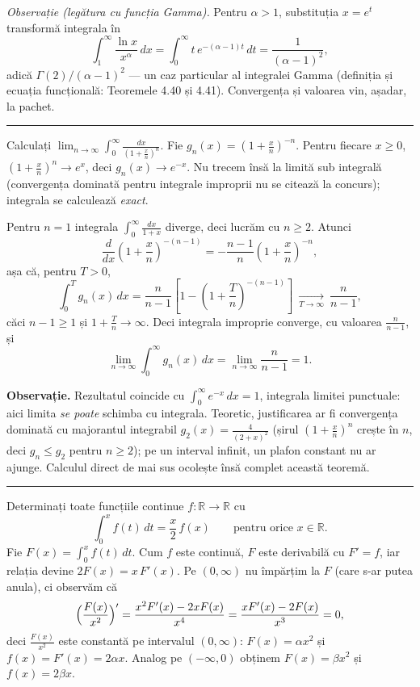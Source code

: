 \emph{Observație (legătura cu funcția Gamma).} Pentru $\alpha>1$, substituția $x=e^{t}$ transformă integrala în
\[ \int_{1}^{\infty}\frac{\ln x}{x^{\alpha}}\,dx=\int_{0}^{\infty}t\,e^{-(\alpha-1)t}\,dt=\frac{1}{(\alpha-1)^{2}} , \]
adică $\Gamma(2)/(\alpha-1)^{2}$ --- un caz particular al integralei Gamma (definiția și ecuația funcțională: Teoremele 4.40 și 4.41). Convergența și valoarea vin, așadar, la pachet.
\vspace{1mm}\hrule

Calculați $\displaystyle\lim_{n\to\infty}\int_0^\infty \frac{dx}{\left(1+\frac{x}{n}\right)^n}$.
\sol Fie $g_n(x)=\left(1+\frac{x}{n}\right)^{-n}$. Pentru fiecare $x\ge 0$, $\left(1+\frac{x}{n}\right)^n\to e^x$, deci $g_n(x)\to e^{-x}$. Nu trecem însă la limită sub integrală (convergența dominată pentru integrale improprii nu se citează la concurs); integrala se calculează \emph{exact}.

Pentru $n=1$ integrala $\int_0^\infty\frac{dx}{1+x}$ diverge, deci lucrăm cu $n\ge2$. Atunci
\[
\frac{d}{dx}\left(1+\frac{x}{n}\right)^{-(n-1)}=-\frac{n-1}{n}\left(1+\frac{x}{n}\right)^{-n},
\]
așa că, pentru $T>0$,
\[
\int_0^T g_n(x)\,dx=\frac{n}{n-1}\left[1-\left(1+\frac{T}{n}\right)^{-(n-1)}\right]\ \xrightarrow[T\to\infty]{}\ \frac{n}{n-1},
\]
căci $n-1\ge1$ și $1+\frac Tn\to\infty$. Deci integrala improprie converge, cu valoarea $\frac{n}{n-1}$, și
\[
\lim_{n\to\infty}\int_0^\infty g_n(x)\,dx=\lim_{n\to\infty}\frac{n}{n-1}=1.
\]

\medskip
\noindent\textbf{Observație.} Rezultatul coincide cu $\int_0^\infty e^{-x}\,dx=1$, integrala limitei punctuale: aici limita \emph{se poate} schimba cu integrala. Teoretic, justificarea ar fi convergența dominată cu majorantul integrabil $g_2(x)=\frac{4}{(2+x)^2}$ (șirul $\left(1+\frac{x}{n}\right)^n$ crește în $n$, deci $g_n\le g_2$ pentru $n\ge2$); pe un interval infinit, un plafon constant nu ar ajunge. Calculul direct de mai sus ocolește însă complet această teoremă.
\vspace{1mm}\hrule

Determinați toate funcțiile continue $f:\mathbb{R}\to\mathbb{R}$ cu
\[ \int_0^x f(t)\,dt=\frac{x}{2}\,f(x)\qquad\text{pentru orice }x\in\mathbb{R}. \]
\sol Fie $F(x)=\int_0^x f(t)\,dt$. Cum $f$ este continuă, $F$ este derivabilă cu
$F'=f$, iar relația devine $2F(x)=x\,F'(x)$.
Pe $(0,\infty)$ nu împărțim la $F$ (care s-ar putea anula), ci observăm că
\[ \Bigl(\frac{F(x)}{x^2}\Bigr)'=\frac{x^2F'(x)-2xF(x)}{x^4}=\frac{xF'(x)-2F(x)}{x^3}=0 , \]
deci $\frac{F(x)}{x^2}$ este constantă pe intervalul $(0,\infty)$: $F(x)=\alpha x^2$ și $f(x)=F'(x)=2\alpha x$. Analog pe $(-\infty,0)$ obținem
$F(x)=\beta x^2$ și $f(x)=2\beta x$.

